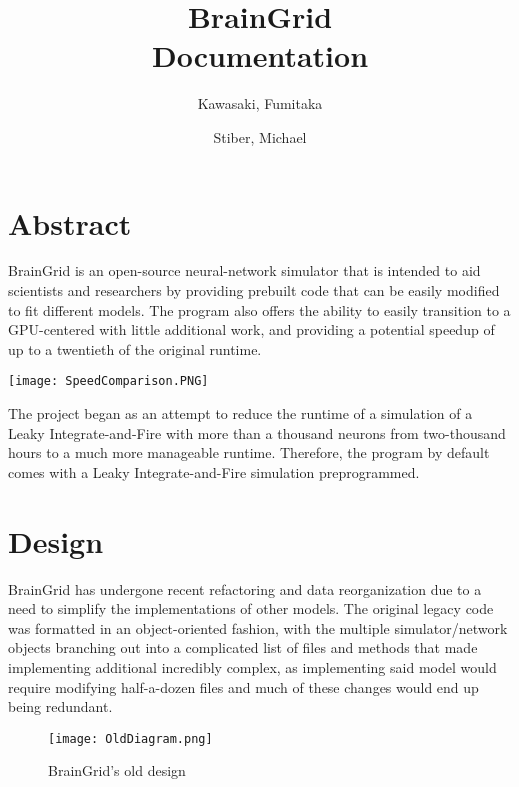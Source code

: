 \documentclass[11pt]{article}
\newcommand\BackgroundPic{%
\put(0,0){%
\parbox[b][\paperheight]{\paperwidth}{%
\vfill
\centering
\texttt{[image: logo.png]}%
\vfill
}}}
\begin{document}
\AddToShipoutPicture*{\BackgroundPic}
\title{BrainGrid\\Documentation}
\author{Kawasaki, Fumitaka \and Stiber, Michael}
\date{} %

\maketitle

\pagebreak
\tableofcontents
\pagebreak

\section{Abstract} \mdseries 
BrainGrid is an open-source neural-network simulator that is intended to aid scientists and researchers by providing prebuilt code that can be easily modified to fit different models. The program also offers the ability to easily transition to a GPU-centered with little additional work, and providing a potential speedup of up to a twentieth of the original runtime.

\begin{center}
	\texttt{[image: SpeedComparison.PNG]}
\end{center}

\noindent \mdseries The project began as an attempt to reduce the runtime of a simulation of a Leaky Integrate-and-Fire with more than a thousand neurons from two-thousand hours to a much more manageable runtime. Therefore, the program by default comes with a Leaky Integrate-and-Fire simulation preprogrammed. 
\pagebreak

\section{Design} \mdseries 
BrainGrid has undergone recent refactoring and data reorganization due to a need to simplify the implementations of other models. The original legacy code was formatted in an object-oriented fashion, with the multiple simulator/network objects branching out into a complicated list of files and methods that made implementing additional incredibly complex, as implementing said model would require modifying half-a-dozen files and much of these changes would end up being redundant. 
\begin{figure}
	\centering
		\texttt{[image: OldDiagram.png]}
		\caption{BrainGrid's old design}
\end{figure}
\pagebreak
\end{document}
